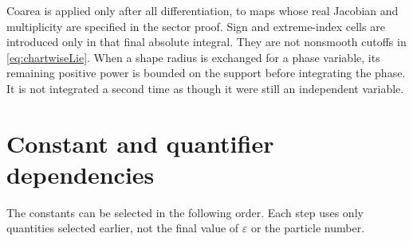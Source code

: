 \documentclass[11pt]{article}
\numberwithin{equation}{section}
\theoremstyle{definition}
\newcommand{\eps}{\varepsilon}
\begin{document}
Coarea is applied only after all differentiation, to maps whose
real Jacobian and multiplicity are specified in the sector proof.
Sign and extreme-index cells are introduced only in that final
absolute integral. They are not nonsmooth cutoffs in
\eqref{eq:chartwiseLie}. When a shape radius is exchanged for a
phase variable, its remaining positive power is bounded on the
support before integrating the phase. It is not integrated a
second time as though it were still an independent variable.



\section{Constant and quantifier dependencies}\label{app:constants}
The constants can be selected in the following order. Each step
uses only quantities selected earlier, not the final value of
\(\eps\) or the particle number.
\end{document}

